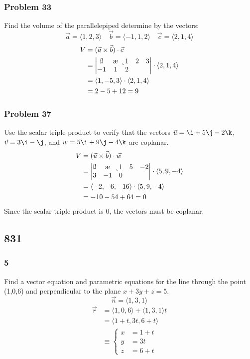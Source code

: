 \documentclass[letterpaper, 12pt]{math}
\begin{document}
\subsubsection*{Problem 33}
Find the volume of the parallelepiped determine by the vectors:
\[ \vec{a} = \langle1,2,3\rangle \quad \vec{b} = \langle-1,1,2\rangle
  \quad \vec{c} = \langle2,1,4\rangle \]
\begin{align*}
  V &= (\vec{a}\times\vec{b})\cdot\vec{c} \\
  &= \begin{vmatrix}
    \i & \j & \k \\
    1 & 2 & 3 \\
    -1 & 1 & 2
  \end{vmatrix}\cdot\langle2,1,4\rangle \\
  &= \langle1,-5,3\rangle\cdot\langle2,1,4\rangle \\
  &= 2-5+12 = 9
\end{align*}

\subsubsection*{Problem 37}
Use the scalar triple product to verify that the vectors \( \vec{u} = \i+5\j-
2\k \), \( \vec{v} = 3\i-\j \), and \( w = 5\i+9\j-4\k \) are coplanar.
\begin{align*}
  V &= (\vec{u}\times\vec{b})\cdot\vec{w} \\
  &= \begin{vmatrix}
    \i & \j & \k \\
    1 & 5 & -2 \\
    3 & -1 & 0
  \end{vmatrix}\cdot\langle5,9,-4\rangle \\
  &= \langle-2,-6,-16\rangle\cdot\langle5,9,-4\rangle \\
  &= -10-54+64 = 0
\end{align*}
Since the scalar triple product is 0, the vectors must be coplanar.

\subsection*{831}

\subsubsection*{5}
Find a vector equation and parametric equations for the line through the
point (1,0,6) and perpendicular to the plane \( x+3y+z = 5 \).
\[ \vec{n} = \langle1,3,1\rangle \]
\begin{align*}
  \vec{r} &= \langle1,0,6\rangle+\langle1,3,1\rangle t \\
  &= \langle1+t,3t,6+t\rangle \\
  &\equiv \begin{cases}
    x &= 1+t \\
    y &= 3t \\
    z &= 6+t
  \end{cases}
\end{align*}
\end{document}
